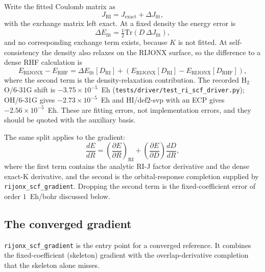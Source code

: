 Write the fitted Coulomb matrix as
\begin{equation}
  J_{\mathrm{RI}} = J_{\mathrm{exact}} + \Delta J_{\mathrm{fit}},
  \label{eq:tutorial-rijonx-jerror}
\end{equation}
with the exchange matrix left exact.  At a fixed density the energy
error is
\begin{equation}
  \Delta E_{\mathrm{fit}}
  = \tfrac{1}{2}\mathrm{Tr}\left(D\,\Delta J_{\mathrm{fit}}\right),
  \label{eq:tutorial-rijonx-eerror}
\end{equation}
and no corresponding exchange term exists, because $K$ is not fitted.
At self-consistency the density also relaxes on the RIJONX surface, so
the difference to a dense RHF calculation is
\begin{equation}
  E_{\mathrm{RIJONX}}-E_{\mathrm{RHF}}
  = \Delta E_{\mathrm{fit}}[D_{\mathrm{RI}}]
    + \left(E_{\mathrm{RIJONX}}[D_{\mathrm{RI}}]
           -E_{\mathrm{RIJONX}}[D_{\mathrm{RHF}}]\right),
  \label{eq:tutorial-rijonx-relax}
\end{equation}
where the second term is the density-relaxation contribution.  The
recorded H$_2$O/6-31G shift is $-3.75\times10^{-5}$~Eh
(\texttt{tests/driver/test\_ri\_scf\_driver.py}); OH/6-31G gives
$-2.73\times10^{-5}$~Eh and HI/def2-svp with an ECP gives
$-2.56\times10^{-5}$~Eh.  These are fitting errors, not implementation
errors, and they should be quoted with the auxiliary basis.

The same split applies to the gradient:
\begin{equation}
  \frac{dE}{dR}
  = \left(\frac{\partial E}{\partial R}\right)_{\mathrm{RI}}
  + \left(\frac{\partial E}{\partial D}\right)
    \frac{dD}{dR},
  \label{eq:tutorial-rijonx-grad-error}
\end{equation}
where the first term contains the analytic RI-J factor derivative and
the dense exact-K derivative, and the second is the orbital-response
completion supplied by \texttt{rijonx\_scf\_gradient}.  Dropping the
second term is the fixed-coefficient error of order $1$~Eh/bohr
discussed below.

\subsection{The converged gradient}

\texttt{rijonx\_scf\_gradient} is the entry point for a converged
reference.  It combines the fixed-coefficient (skeleton) gradient with
the overlap-derivative completion that the skeleton alone misses.

